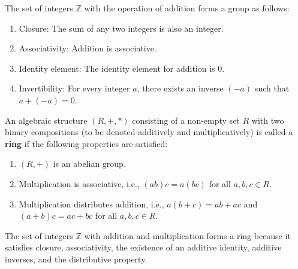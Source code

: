 \begin{example}
    The set of integers \(\mathbb{Z}\) with the operation of addition forms a group as follows:
\begin{center}
    \begin{enumerate}
    \item Closure: The sum of any two integers is also an integer.
    \item Associativity: Addition is associative.
    \item Identity element: The identity element for addition is \(0\).
    \item Invertibility: For every integer \(a\), there exists an inverse \((-a)\) such that \(a + (-a) = 0\).
\end{enumerate}
\end{center}

\end{example}
\begin{definition}
An algebraic structure \((R,+,*)\) consisting of a non-empty set \(R\) with two binary compositions (to be denoted additively and multiplicatively) is called a \textbf{ring} if the following properties are satisfied:
\begin{enumerate}
    \item \((R, +)\) is an abelian group.
    \item Multiplication is associative, i.e., \((ab)c = a(bc)\) for all \(a, b, c \in R\).
    \item Multiplication distributes addition, i.e., \(a(b+c) = ab + ac\) and \((a+b)c = ac + bc\) for all \(a, b, c \in R\).%
\end{enumerate}
    
\end{definition}
\begin{example}
    The set of integers \(\mathbb{Z}\) with addition and multiplication forms a ring because it satisfies closure, associativity, the existence of an additive identity, additive inverses, and the distributive property.

\end{example} 
